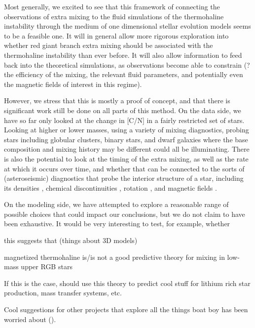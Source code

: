 Most generally, we excited to see that this framework of connecting the observations of extra mixing to the fluid simulations of the thermohaline instability through the medium of one dimensional stellar evolution models seems to be a feasible one. It will in general allow more rigorous exploration into whether red giant branch extra mixing should be associated with the thermohaline instability than ever before. It will also allow information to feed back into the theoretical simulations, as observations become able to constrain (? the efficiency of the mixing, the relevant fluid parameters, and potentially even the magnetic fields of interest in this regime). 

However, we stress that this is mostly a proof of concept, and that there is significant work still be done on all parts of this method. On the data side, we have so far only looked at the change in [C/N] in a fairly restricted set of stars. Looking at higher or lower masses, using a variety of mixing diagnostics, probing stars including globular clusters, binary stars, and dwarf galaxies where the base composition and mixing history may be different could all be illuminating. There is also the potential to look at the timing of the extra mixing, as well as the rate at which it occurs over time, and whether that can be connected to the sorts of (asteroseismic) diagnostics that probe the interior structure of a star, including its densities \citep{KjeldsenBedding1995}, chemical discontinuities \citep{Verma2017}, rotation \citep{Gehan2018}, and magnetic fields \citep{Bugnet2021}. 

On the modeling side, we have attempted to explore a reasonable range of possible choices that could impact our conclusions, but we do not claim to have been exhaustive. It would be very interesting to test, for example, whether
    
    this suggests that (things about 3D models)
    
    magnetized thermohaline is/is not a good predictive theory for mixing in low-mass upper RGB stars

    
    If this is the case, should use this theory to predict cool stuff for lithium rich star production, mass transfer systems, etc. 
    
    Cool suggestions for other projects that explore all the things boat boy has been worried about (\partyparrot).

